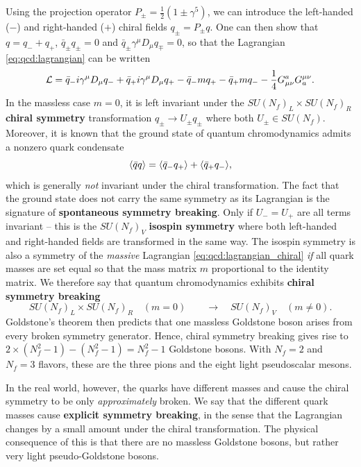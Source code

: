 Using the projection operator $P_\pm = \frac12 (1 \pm \gamma^5)$, we can introduce the left-handed ($-$) and right-handed ($+$) chiral fields $q_\pm = P_\pm q$.
One can then show that $q = q_- + q_+$, $\bar{q}_\pm q_\pm = 0$ and $\bar{q}_\pm \gamma^\mu D_\mu q_\mp = 0$, so that the Lagrangian \eqref{eq:qcd:lagrangian} can be written
\begin{equation}
	\mathcal{L} = \bar{q}_- i \gamma^\mu D_\mu q_- + \bar{q}_+ i \gamma^\mu D_\mu q_+ - \bar{q}_- m q_+ - \bar{q}_+ m q_- - \frac14 G_{\mu\nu}^a G^{\mu\nu}_a.
\label{eq:qcd:lagrangian_chiral}
\end{equation}
In the massless case $m=0$,
it is left invariant under the $SU(N_f)_L \times SU(N_f)_R$ \textbf{chiral symmetry} transformation $q_\pm \rightarrow U_\pm q_\pm$ where both $U_\pm \in SU(N_f)$.
Moreover, it is known that the ground state of quantum chromodynamics admits a nonzero quark condensate \cite[chapter 28]{ref:schwartz}
\begin{equation}
	\avg{\bar{q} q} %
	                                                            = \avg{\bar{q}_- q_+} + \avg{\bar{q}_+ q_-},
\end{equation}
which is generally \emph{not} invariant under the chiral transformation.
The fact that the ground state does not carry the same symmetry as its Lagrangian is the signature of \textbf{spontaneous symmetry breaking}.
Only if $U_- = U_+$ are all terms invariant -- this is the $SU(N_f)_V$ \textbf{isospin symmetry} where both left-handed and right-handed fields are transformed in the same way.
The isospin symmetry is also a symmetry of the \emph{massive} Lagrangian \eqref{eq:qcd:lagrangian_chiral} \emph{if} all quark masses are set equal so that the mass matrix $m$ proportional to the identity matrix.
We therefore say that quantum chromodynamics exhibits \textbf{chiral symmetry breaking}
\begin{equation}
	SU(N_f)_L \times SU(N_f)_R \quad (m = 0) \qquad \rightarrow \quad SU(N_f)_V \quad (m \neq 0).
\end{equation}
Goldstone's theorem then predicts that one massless Goldstone boson arises from every broken symmetry generator.
Hence, chiral symmetry breaking gives rise to $2 \times (N_f^2 - 1) - (N_f^2 - 1) = N_f^2 - 1$ Goldstone bosons.
With $N_f = 2$ and $N_f = 3$ flavors, these are the three pions and the eight light pseudoscalar mesons.

In the real world, however, the quarks have different masses and cause the chiral symmetry to be only \emph{approximately} broken.
We say that the different quark masses cause \textbf{explicit symmetry breaking}, in the sense that the Lagrangian changes by a small amount under the chiral transformation.
The physical consequence of this is that there are no massless Goldstone bosons, but rather very light pseudo-Goldstone bosons.

